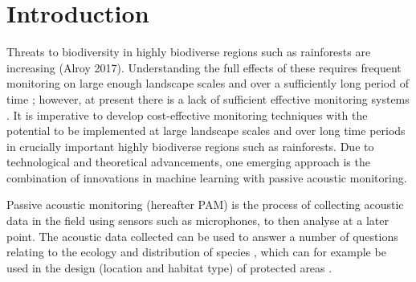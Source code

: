 \documentclass[11pt]{article}
\begin{document}
\section{Introduction}

Threats to biodiversity in highly biodiverse regions such as rainforests are increasing (Alroy 2017). Understanding the full effects of these requires frequent monitoring on large enough landscape scales \citep{underwood2005large,porter2009new} and over a sufficiently long period of time \citep{porter2005wireless}; however, at present there is a lack of sufficient effective monitoring systems \citep{proencca2017global}. It is imperative to develop cost-effective monitoring techniques with the potential to be implemented at large landscape scales and over long time periods in crucially important highly biodiverse regions such as rainforests. Due to technological and theoretical advancements, one emerging approach is the combination of innovations in machine learning with passive acoustic monitoring.

Passive acoustic monitoring (hereafter PAM) is the process of collecting acoustic data in the field using sensors such as microphones, to then analyse at a later point. The acoustic data collected can be used to answer a number of questions relating to the ecology and distribution of species \citep{browning2017passive}, which can for example be used in the design (location and habitat type) of protected areas \citep{rayment2009use}. 
\end{document}
